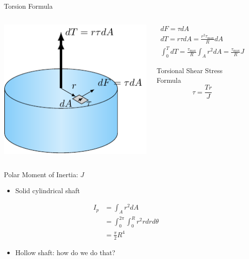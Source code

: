 \documentclass[10pt, svgnames]{beamer}
\begin{document}
\begin{frame}[label={sec:orgcfd9f8c}]{Torsion Formula}
\begin{columns}
\begin{column}{0.5\columnwidth}
\begin{center}
\includegraphics[width=.9\linewidth]{pictures/torsion-formula.pdf}
\end{center}
\end{column}

\begin{column}{0.5\columnwidth}
\begin{gather*}
  dF = \tau dA \\
  dT = r \tau dA = \frac{r^2 \tau_{\max}}{R} dA \\
  \int_0^T dT = \frac{ \tau_{\max} }{R} \int_A r^2 dA = \frac{ \tau_{\max}}{R} J
\end{gather*}

\begin{block}{\small Torsional Shear Stress Formula}
  $$ \tau = \frac{ Tr }{J} $$
\end{block}
\end{column}
\end{columns}
\end{frame}

\begin{frame}[label={sec:orgd3ae352}]{Polar Moment of Inertia: \(J\)}
\begin{itemize}
\item Solid cylindrical shaft
\end{itemize}

\begin{align*}
  I_p &= \int_A r^2 dA \\
      &= \int_0^{2\pi} \int_0^R r^2 r dr d\theta \\
      &= \frac{\pi}{2} R^4
\end{align*}

\begin{itemize}
\item Hollow shaft: how do we do that?
\end{itemize}
\end{frame}
\end{document}
